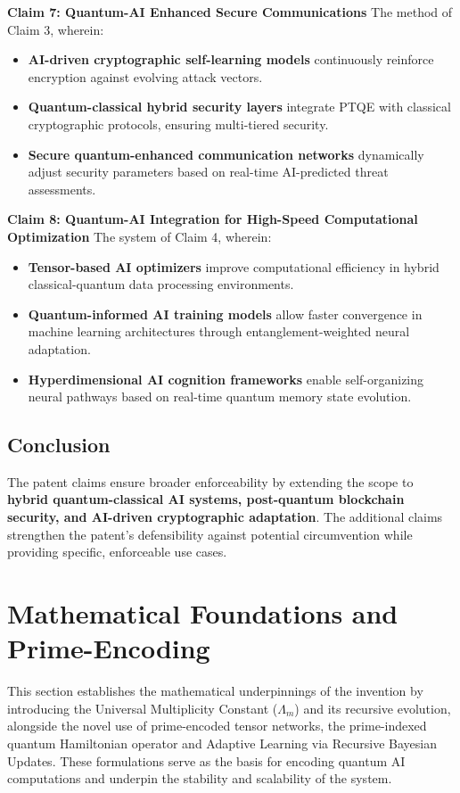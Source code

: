 \documentclass{article}
\theoremstyle{plain}
\begin{document}
\noindent \textbf{Claim 7: Quantum-AI Enhanced Secure Communications}  
The method of Claim 3, wherein:

\begin{itemize}
    \item \textbf{AI-driven cryptographic self-learning models} continuously reinforce encryption against evolving attack vectors.
    \item \textbf{Quantum-classical hybrid security layers} integrate PTQE with classical cryptographic protocols, ensuring multi-tiered security.
    \item \textbf{Secure quantum-enhanced communication networks} dynamically adjust security parameters based on real-time AI-predicted threat assessments.
\end{itemize}

\noindent \textbf{Claim 8: Quantum-AI Integration for High-Speed Computational Optimization}  
The system of Claim 4, wherein:

\begin{itemize}
    \item \textbf{Tensor-based AI optimizers} improve computational efficiency in hybrid classical-quantum data processing environments.
    \item \textbf{Quantum-informed AI training models} allow faster convergence in machine learning architectures through entanglement-weighted neural adaptation.
    \item \textbf{Hyperdimensional AI cognition frameworks} enable self-organizing neural pathways based on real-time quantum memory state evolution.
\end{itemize}

\subsection{Conclusion}

The patent claims ensure broader enforceability by extending the scope to \textbf{hybrid quantum-classical AI systems, post-quantum blockchain security, and AI-driven cryptographic adaptation}. The additional claims strengthen the patent’s defensibility against potential circumvention while providing specific, enforceable use cases.

\section{Mathematical Foundations and Prime-Encoding}

This section establishes the mathematical underpinnings of the invention by introducing the Universal Multiplicity Constant ($\Lambda_m$) and its recursive evolution, alongside the novel use of prime-encoded tensor networks, the prime-indexed quantum Hamiltonian operator and Adaptive Learning via Recursive Bayesian Updates. These formulations serve as the basis for encoding quantum AI computations and underpin the stability and scalability of the system.
\end{document}
